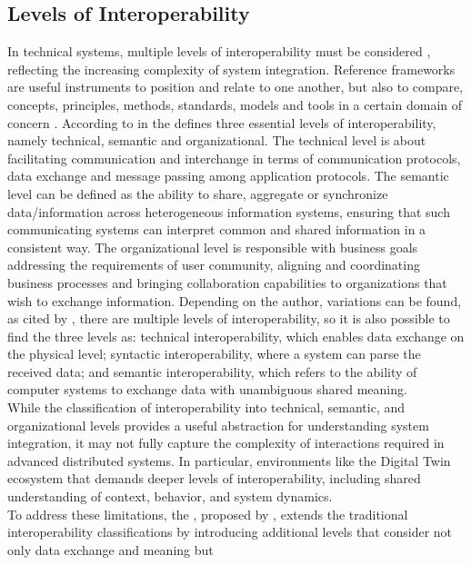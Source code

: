 \subsection{Levels of Interoperability}
\label{sec:levels_of_interoperability}
In technical systems, multiple levels of interoperability must be considered \cite{Jacoby2020}, reflecting the increasing complexity
of system integration. Reference frameworks are useful instruments to position and relate to one another, but also to compare, 
concepts, principles, methods, standards, models and tools in a certain domain of concern \cite{Vernadat2010}. 
According to  \EC in the \EIF defines three 
essential levels of interoperability, namely technical, semantic and organizational. The technical level is about facilitating 
communication and interchange in terms of communication protocols, data exchange and message passing among application protocols. 
The semantic level can be defined as the ability to share, aggregate or synchronize data/information across heterogeneous information 
systems, ensuring that such communicating systems can interpret common and shared information in a consistent way. The organizational 
level is responsible with business goals addressing the requirements of user community, aligning and coordinating business processes 
and bringing collaboration capabilities to organizations that wish to exchange information. Depending on the author, variations can 
be found, as cited by , there are multiple levels of interoperability, so it is also possible to find the 
three levels as: technical interoperability, which enables data exchange on the physical level; syntactic interoperability, 
where a system can parse the received data; and semantic interoperability, which refers to the ability of computer systems to 
exchange data with unambiguous shared meaning.\\
While the classification of interoperability into technical, semantic, and organizational levels provides a useful abstraction for 
understanding system integration, it may not fully capture the complexity of interactions required in advanced distributed systems. 
In particular, environments like the Digital Twin ecosystem that demands deeper levels of interoperability, including shared 
understanding of context, behavior, and system dynamics.\\
To address these limitations, the \LCIM, proposed by , extends the 
traditional interoperability classifications by introducing additional levels that consider not only data exchange and meaning but 
